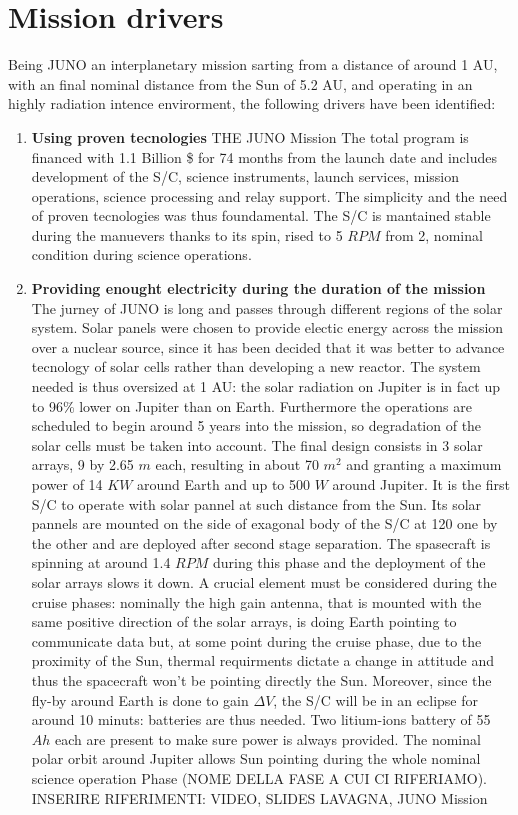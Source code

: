 \section{Mission drivers}
\label{sec:drivers}

Being JUNO an interplanetary mission sarting from a distance of around 1 AU, with an final nominal distance from the Sun of 5.2 AU, and operating in an highly radiation intence envirorment, the following drivers have been identified: 

\begin{enumerate}[leftmargin=1.5em]
    \item \textbf{Using proven tecnologies} THE JUNO Mission
    \newline The total program is financed with 1.1 Billion \$ for 74 months from the launch date and includes development of the S/C, science instruments, launch services, mission operations, science processing and relay support. The simplicity and the need of proven tecnologies was thus foundamental. The S/C is mantained stable during the manuevers thanks to its spin, rised to 5 $RPM$ from 2, nominal condition during science operations. 
    \item \textbf{Providing enought electricity during the duration of the mission} 
    \label{solar drivers}
    \newline The jurney of JUNO is long and passes through different regions of the solar system. Solar panels were chosen to provide electic energy across the mission over a nuclear source, since it has been decided that it was better to advance tecnology of solar cells rather than developing a new reactor. The system needed is thus oversized at 1 AU: the solar radiation on Jupiter is in fact up to 96\% lower on Jupiter than on Earth. Furthermore the operations are scheduled to begin around 5 years into the mission, so degradation of the solar cells must be taken into account. The final design consists in 3 solar arrays, 9 by 2.65 $m$ each, resulting in about 70 $m^2$ and granting a maximum power of 14 $KW$ around Earth and up to 500 $W$ around Jupiter. It is the first S/C to operate with solar pannel at such distance from the Sun. Its solar pannels are mounted on the side of exagonal body of the S/C at 120\textdegree \; one by the other and are deployed after second stage separation. The spasecraft is spinning at around 1.4 $RPM$ during this phase and the deployment of the solar arrays slows it down. A crucial element must be considered during the cruise phases: nominally the high gain antenna, that is mounted with the same positive direction of the solar arrays, is doing Earth pointing to communicate data but, at some point during the cruise phase, due to the proximity of the Sun, thermal requirments dictate a change in attitude and thus the spacecraft won't be pointing directly the Sun. Moreover, since the fly-by around Earth is done to gain $\Delta V$, the S/C will be in an eclipse for around 10 minuts: batteries are thus needed. Two litium-ions battery of 55 $Ah$ each are present to make sure power is always provided. The nominal polar orbit around Jupiter allows Sun pointing during the whole nominal science operation Phase (NOME DELLA FASE A CUI CI RIFERIAMO).              INSERIRE RIFERIMENTI: VIDEO, SLIDES LAVAGNA, JUNO Mission

\end{enumerate}
